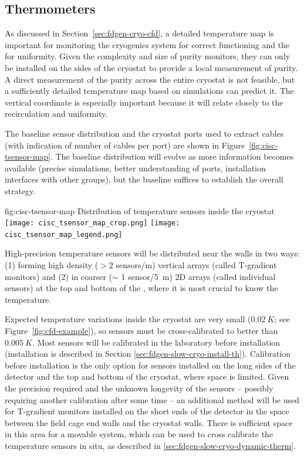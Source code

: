 \subsection{Thermometers}
\label{sec:fdsp-cryo-therm}
As discussed in Section~\ref{sec:fdgen-cryo-cfd}, a detailed \threed temperature map is important for monitoring 
the cryogenics system for correct functioning and the  for uniformity.
Given the complexity and size of purity monitors, they can only be installed on the sides of the cryostat to provide a local measurement of
 purity.  
A direct measurement of the  purity across the entire cryostat is not feasible, but a sufficiently detailed \threed temperature map based on  simulations can predict it. The vertical coordinate is especially important because it will relate closely to the 
 recirculation and uniformity. 

The baseline sensor distribution and the cryostat ports used to extract cables (with indication of number of cables per port) are shown in Figure~\ref{fig:cisc-tsensor-map}. The baseline distribution will evolve as more information becomes available (precise  simulations, better understanding of  ports, installation interfaces with other groups), but the baseline suffices to establish the overall strategy.

\begin{dunefigure}{fig:cisc-tsensor-map}
  {Distribution of temperature sensors inside the cryostat}
  \texttt{[image: cisc\_tsensor\_map\_crop.png]}
  \texttt{[image: cisc\_tsensor\_map\_legend.png]}
\end{dunefigure}


High-precision temperature sensors will be distributed near the  walls in two ways:
(1) forming high density (\(>2\) sensors/\si{m}) vertical arrays %
(called T-gradient monitors) and (2) in coarser ($\sim$ 1 sensor/\SI{5}{m}) 2D arrays %
(called individual sensors) at the top and bottom of the , where it is most crucial to know the temperature.

Expected temperature variations inside the cryostat are very small ($\SI{0.02}{K}$; see Figure~\ref{fig:cfd-example}),
so sensors must be cross-calibrated to better than $\SI{0.005}{K}$. Most sensors will be calibrated in the laboratory before installation
(installation is described in Section \ref{sec:fdgen-slow-cryo-install-th}).
Calibration before installation is the only option for sensors installed on the long sides of the detector and the top and bottom of the cryostat, where space is limited.
Given the precision required and the unknown longevity of the sensors -- possibly requiring another  calibration after some time -- an additional method
will be used for T-gradient monitors installed on the short ends of the detector in the space between the field cage end walls and the cryostat walls. There is sufficient space in this area for a movable system, which can be used to cross calibrate
the temperature sensors in situ, as described in \ref{sec:fdgen-slow-cryo-dynamic-therm}.

